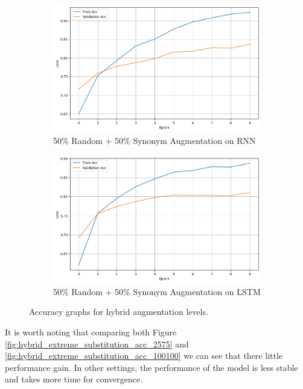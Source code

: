 \documentclass{article}
\begin{document}
\begin{figure}[ht]
  \centering
  \begin{subfigure}[b]{0.45\textwidth}
    \includegraphics[width=\textwidth]{img/hybrid_100_rnn.png}
    \caption{50\% Random + 50\% Synonym Augmentation on RNN}
    \label{fig:hybrid_100_rnn}
  \end{subfigure}
  \hfill
  \begin{subfigure}[b]{0.45\textwidth}
    \includegraphics[width=\textwidth]{img/hybrid_100_lstm.png}
    \caption{50\% Random + 50\% Synonym Augmentation on LSTM}
    \label{fig:hybrid_100_lstm}
  \end{subfigure}
  \caption{Accuracy graphs for hybrid augmentation levels.}
  \label{fig:hybrid_extreme_substitution_acc_5050}
\end{figure}

It is worth noting that comparing both Figure
\ref{fig:hybrid_extreme_substitution_acc_2575} and
\ref{fig:hybrid_extreme_substitution_acc_100100} we can see that there little
performance gain. In other settings, the performance of the model is less
stable and takes more time for convergence.
\end{document}
